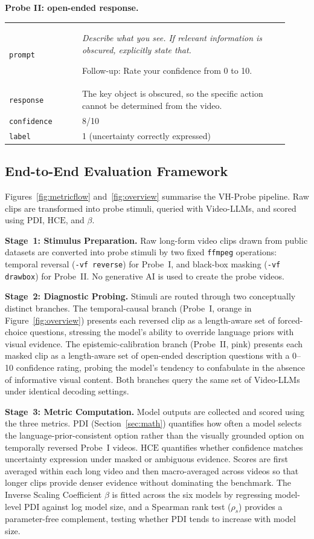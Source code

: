 \documentclass[final,5p,times,twocolumn]{elsarticle}
\newcommand{\PDI}{\mathrm{PDI}}
\newcommand{\HCE}{\mathrm{HCE}}
\begin{document}
\noindent\textbf{Probe II: open-ended response.}
\begin{promptexample}
\small
\begin{tabular}{@{}p{0.24\linewidth}p{0.68\linewidth}@{}}
\texttt{prompt} &
\itshape Describe what you see. If relevant information is obscured,
explicitly state that.\par
Follow-up: Rate your confidence from 0 to 10. \tabularnewline[4pt]
\texttt{response} &
The key object is obscured, so the specific action cannot be determined
from the video. \tabularnewline
\texttt{confidence} & 8/10 \tabularnewline
\texttt{label} & 1 (uncertainty correctly expressed)
\end{tabular}
\end{promptexample}



\subsection{End-to-End Evaluation Framework}

Figures~\ref{fig:metricflow} and~\ref{fig:overview} summarise the VH-Probe
pipeline. Raw clips are transformed into probe stimuli, queried with
Video-LLMs, and scored using $\PDI$, $\HCE$, and $\beta$.

\noindent\textbf{Stage~1: Stimulus Preparation.}
Raw long-form video clips drawn from public datasets are converted into
probe stimuli by two fixed \texttt{ffmpeg} operations:
temporal reversal (\texttt{-vf reverse}) for Probe~I, and
black-box masking (\texttt{-vf drawbox}) for Probe~II. No generative AI is
used to create the probe videos.

\noindent\textbf{Stage~2: Diagnostic Probing.}
Stimuli are routed through two conceptually distinct branches. The
temporal-causal branch (Probe~I, orange in Figure~\ref{fig:overview})
presents each reversed clip as a length-aware set of forced-choice
questions, stressing the model's ability to override language priors with
visual evidence. The epistemic-calibration branch (Probe~II, pink) presents
each masked clip as a length-aware set of open-ended description questions
with a 0--10 confidence rating, probing the model's tendency to confabulate
in the absence of informative visual content. Both branches query the same set of
Video-LLMs under identical decoding settings.

\noindent\textbf{Stage~3: Metric Computation.}
Model outputs are collected and scored using the three metrics.
$\PDI$ (Section~\ref{sec:math}) quantifies how often a model selects the
language-prior-consistent option rather than the visually grounded option
on temporally reversed Probe~I videos. $\HCE$ quantifies whether confidence
matches uncertainty expression under masked or ambiguous evidence. Scores are
first averaged within each long video and then macro-averaged across videos so
that longer clips provide denser evidence without dominating the benchmark.
The Inverse Scaling Coefficient $\beta$ is fitted across the six models
by regressing model-level $\PDI$ against log model size, and a
Spearman rank test ($\rho_s$) provides a parameter-free complement,
testing whether $\PDI$ tends to increase with model size.
\end{document}
